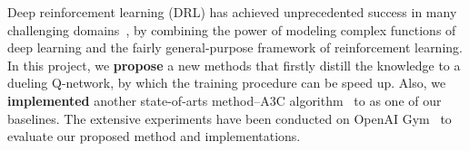 Deep reinforcement learning (DRL) has achieved
unprecedented success in many challenging
domains~\cite{mnih2015human,silver2016mastering}, by combining the power of modeling complex
functions of deep learning and the fairly general-purpose framework of reinforcement learning.
In this project, we \textbf{propose} a new methods that firstly distill the knowledge to a dueling Q-network,
by which the training procedure can be speed up.
Also, we \textbf{implemented} another state-of-arts method--A3C algorithm~\cite{mnih2016asynchronous} to 
as one of our baselines.
The extensive experiments have been conducted on OpenAI Gym~\cite{brockman2016openai} to evaluate 
our proposed method and implementations.
